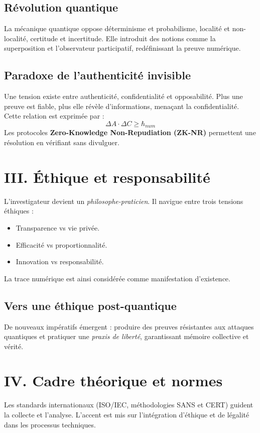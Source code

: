 \documentclass[12pt,a4paper]{article}
\begin{document}
\subsection{Révolution quantique}
La mécanique quantique oppose déterminisme et probabilisme, localité et non-localité, 
certitude et incertitude. Elle introduit des notions comme la superposition et 
l’observateur participatif, redéfinissant la preuve numérique.

\subsection{Paradoxe de l’authenticité invisible}
Une tension existe entre authenticité, confidentialité et opposabilité. 
Plus une preuve est fiable, plus elle révèle d’informations, menaçant la confidentialité. 
Cette relation est exprimée par :
\[
\Delta A \cdot \Delta C \geq \hbar_{num}
\]
Les protocoles \textbf{Zero-Knowledge Non-Repudiation (ZK-NR)} permettent une résolution 
en vérifiant sans divulguer.

\section{III. Éthique et responsabilité}
L’investigateur devient un \textit{philosophe-praticien}. 
Il navigue entre trois tensions éthiques :
\begin{itemize}
\item Transparence vs vie privée.
\item Efficacité vs proportionnalité.
\item Innovation vs responsabilité.
\end{itemize}
La trace numérique est ainsi considérée comme manifestation d’existence.

\subsection{Vers une éthique post-quantique}
De nouveaux impératifs émergent : produire des preuves résistantes aux attaques quantiques 
et pratiquer une \textit{praxis de liberté}, garantissant mémoire collective et vérité.

\section*{IV. Cadre théorique et normes}
Les standards internationaux (ISO/IEC, méthodologies SANS et CERT) guident la collecte 
et l’analyse. L’accent est mis sur l’intégration d’éthique et de légalité 
dans les processus techniques.
\end{document}
